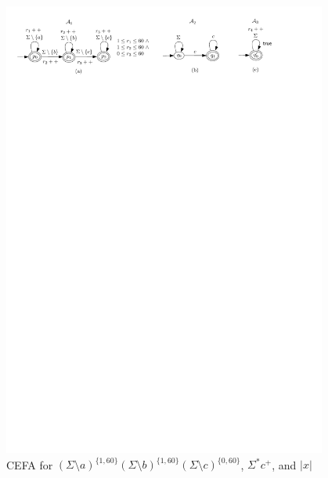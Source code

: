 
\begin{figure}[ht]
  \centering
  \includegraphics[width = 0.95\textwidth]{sections/overview-cefa.pdf}
  \caption{CEFA for $(\Sigma \setminus a)^{\{1, 60\}} (\Sigma \setminus b)^{\{1, 60\}} (\Sigma \setminus c)^{\{0, 60\}}$, $\Sigma^* c^+$, and $|x|$}
  \label{fig:overview}
\end{figure}

